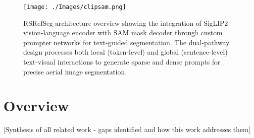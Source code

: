 \begin{figure}[H]
\centering
\texttt{[image: ./Images/clipsam.png]}
\caption{RSRefSeg architecture overview showing the integration of SigLIP2 vision-language encoder with SAM mask decoder through custom prompter networks for text-guided segmentation. The dual-pathway design processes both local (token-level) and global (sentence-level) text-visual interactions to generate sparse and dense prompts for precise aerial image segmentation.}
\label{fig:rsrefseg_architecture}
\end{figure}

\section{Overview}

[Synthesis of all related work - gaps identified and how this work addresses them] %